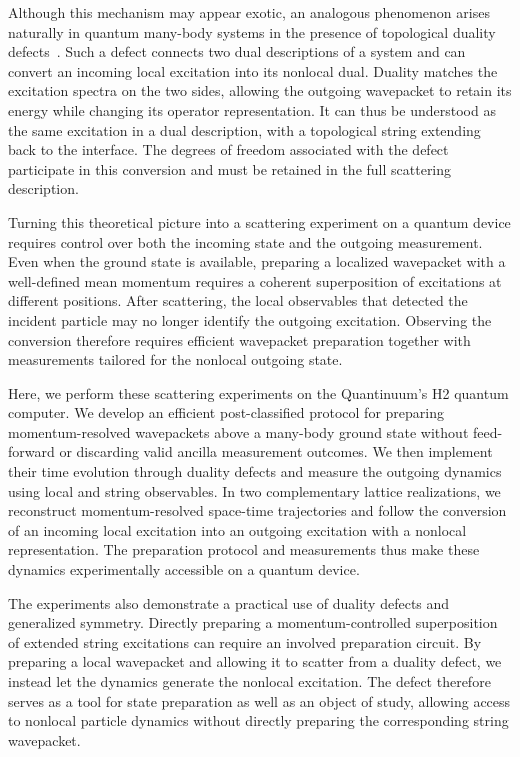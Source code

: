 \documentclass[aps,floatfix,10pt,amssymb,amsfont,amsmath,superscriptaddress,float,nofootinbib,longbibliography,nobalancelastpage,twocolumn]{revtex4-2}
\begin{document}
Although this mechanism may appear exotic, an analogous phenomenon arises naturally in quantum many-body systems in the presence of topological duality defects~\cite{ueda2025,Ueda:2026wvc}. Such a defect connects two dual descriptions of a system and can convert an incoming local excitation into its nonlocal dual. Duality matches the excitation spectra on the two sides, allowing the outgoing wavepacket to retain its energy while changing its operator representation. It can thus be understood as the same excitation in a dual description, with a topological string extending back to the interface. The degrees of freedom associated with the defect participate in this conversion and must be retained in the full scattering description.

Turning this theoretical picture into a scattering experiment on a quantum device requires control over both the incoming state and the outgoing measurement. Even when the ground state is available, preparing a localized wavepacket with a well-defined mean momentum requires a coherent superposition of excitations at different positions. After scattering, the local observables that detected the incident particle may no longer identify the outgoing excitation. Observing the conversion therefore requires efficient wavepacket preparation together with measurements tailored for the nonlocal outgoing state.

Here, we perform these scattering experiments on the Quantinuum's H2 quantum computer. We develop an efficient post-classified protocol for preparing momentum-resolved wavepackets above a many-body ground state without feed-forward or discarding valid ancilla measurement outcomes. We then implement their time evolution through duality defects and measure the outgoing dynamics using local and string observables. In two complementary lattice realizations, we reconstruct momentum-resolved space-time trajectories and follow the conversion of an incoming local excitation into an outgoing excitation with a nonlocal representation. The preparation protocol and measurements thus make these dynamics experimentally accessible on a quantum device.

The experiments also demonstrate a practical use of duality defects and generalized symmetry. Directly preparing a momentum-controlled superposition of extended string excitations can require an involved preparation circuit. By preparing a local wavepacket and allowing it to scatter from a duality defect, we instead let the dynamics generate the nonlocal excitation. The defect therefore serves as a tool for state preparation as well as an object of study, allowing access to nonlocal particle dynamics without directly preparing the corresponding string wavepacket.
\end{document}
